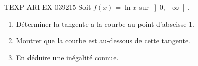 \begin{exercice}{TEXP-ARI-EX-039}{2}{15}
Soit $f(x) = \ln x$ sur $\left]0, +\infty\right[$.
\begin{enumerate}
  \item Déterminer la tangente a la courbe au point d'abscisse $1$.
  \item Montrer que la courbe est au-dessous de cette tangente.
  \item En déduire une inégalité connue.
\end{enumerate}

\end{exercice}
